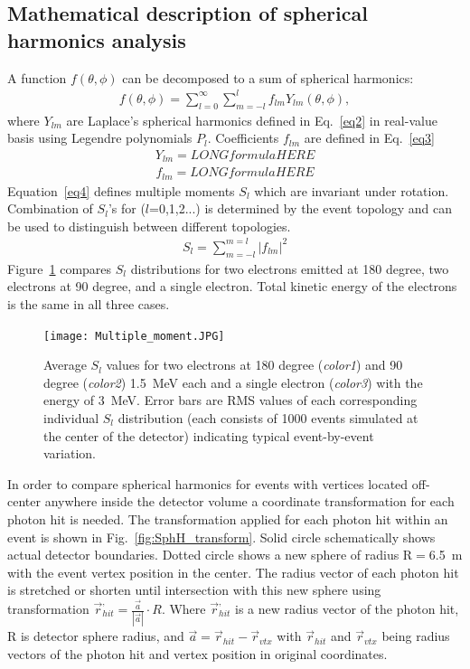 \subsection{Mathematical description of spherical harmonics analysis}
A function $f(\theta,\phi)$ can be decomposed to a sum of spherical
harmonics:
\begin{eqnarray}
  \label{eq1}
  f(\theta,\phi) = \sum_{l=0}^{\infty} \sum_{m=-l}^{l} f_{lm}
  Y_{lm}(\theta,\phi),
\end{eqnarray}
where $Y_{lm}$ are Laplace's spherical harmonics defined in
Eq.~\ref{eq2} in real-value basis using Legendre polynomials
$P_l$. Coefficients $f_{lm}$ are defined in Eq.~\ref{eq3}
\begin{eqnarray}
  \label{eq2}
  Y_{lm} = LONGformulaHERE
\end{eqnarray}
\begin{eqnarray}
  \label{eq3}
  f_{lm} = LONGformulaHERE
\end{eqnarray}
Equation~\ref{eq4} defines multiple moments $S_l$ which are invariant
under rotation. Combination of $S_l$'s for ($l$=0,1,2...) is
determined by the event topology and can be used to distinguish
between different topologies.
\begin{eqnarray}
  \label{eq4}
  S_l = \sum_{m=-l}^{m=l} |f_{lm}|^2
\end{eqnarray}
Figure~\ref{fig:Moments} compares $S_l$ distributions for two
electrons emitted at 180 degree, two electrons at 90 degree, and a
single electron. Total kinetic energy of the electrons is the same in
all three cases.

\begin{figure}[h]
  \centering
  \texttt{[image: Multiple\_moment.JPG]}
  \caption{Average $S_l$ values for two electrons at 180 degree
    (\emph{color1}) and 90 degree (\emph{color2}) 1.5~MeV each and a
    single electron (\emph{color3}) with the energy of 3~MeV. Error
    bars are RMS values of each corresponding individual $S_l$
    distribution (each consists of 1000 events simulated at the center
    of the detector) indicating typical event-by-event variation.}
\label{fig:Moments}
\end{figure}


In order to compare spherical harmonics for events with vertices
located off-center anywhere inside the detector volume a coordinate
transformation for each photon hit is needed. The transformation
applied for each photon hit within an event is shown in
Fig.~\ref{fig:SphH_transform}. Solid circle schematically shows actual
detector boundaries. Dotted circle shows a new sphere of radius
R$=$6.5~m with the event vertex position in the center. The radius
vector of each photon hit is stretched or shorten until intersection
with this new sphere using transformation $\vec{r}^{,}_{hit} =
\frac{\vec{a}}{|\vec{a}|} \cdot R$. Where $\vec{r}^{,}_{hit}$ is a new
radius vector of the photon hit, R is detector sphere radius, and
$\vec{a}=\vec{r}_{hit} - \vec{r}_{vtx}$ with $\vec{r}_{hit}$ and
$\vec{r}_{vtx}$ being radius vectors of the photon hit and vertex
position in original coordinates.

